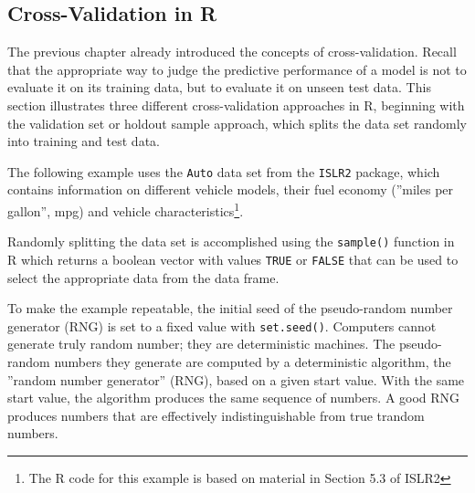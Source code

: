\begin{withcode}
\section{Cross-Validation in R}

The previous chapter already introduced the concepts of cross-validation. Recall that the appropriate way to judge the predictive performance of a model is not to evaluate it on its training data, but to evaluate it on unseen test data. This section illustrates three different cross-validation approaches in R, beginning with the validation set or holdout sample approach, which splits the data set randomly into training and test data. 

The following example uses the \texttt{Auto} data set from the \texttt{ISLR2} package, which contains information on different vehicle models, their fuel economy (''miles per gallon'', mpg) and vehicle characteristics\footnote{The R code for this example is based on material in Section 5.3 of ISLR2}.

Randomly splitting the data set is accomplished using the \texttt{sample()} function in R which returns a boolean vector with values \texttt{TRUE} or \texttt{FALSE} that can be used to select the appropriate data from the data frame. 

To make the example repeatable, the initial seed of the pseudo-random number generator (RNG) is set to a fixed value with \texttt{set.seed()}. Computers cannot generate truly random number; they are deterministic machines. The pseudo-random numbers they generate are computed by a deterministic algorithm, the ''random number generator'' (RNG), based on a given start value. With the same start value, the algorithm produces the same sequence of numbers. A good RNG produces numbers that are effectively indistinguishable from true trandom numbers.

\end{withcode}
